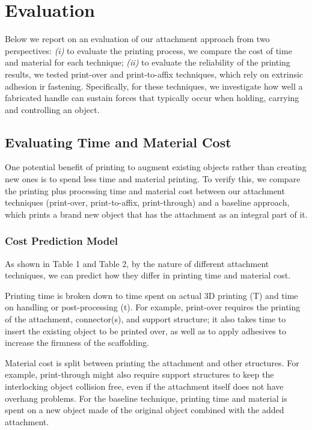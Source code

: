 \section{Evaluation}
Below we report on an evaluation of our attachment approach from two perspectives: {\em (i)} to evaluate the printing process, we compare the cost of time and material for each technique; {\em (ii)} to evaluate the reliability of the printing results, we tested print-over and print-to-affix techniques, which rely on extrinsic adhesion ir fastening. Specifically, for these techniques, we investigate how well a fabricated handle can sustain forces that typically occur when holding, carrying and controlling an object.

\subsection{Evaluating Time and Material Cost}
One potential benefit of printing to augment existing objects rather than creating new ones is to spend less time and material printing. To verify this, we compare the printing plus processing time and material cost between our attachment techniques (print-over, print-to-affix, print-through) and a baseline approach, which prints a brand new object that has the attachment as an integral part of it.

\subsubsection{Cost Prediction Model}
As shown in Table 1 and Table 2, by the nature of different attachment techniques, we can predict how they differ in printing time and material cost.

Printing time is broken down to time spent on actual 3D printing (T) and time on handling or post-processing (t). For example, print-over requires the printing of the attachment, connector(s), and support structure; it also takes time to insert the existing object to be printed over, as well as to apply adhesives to increase the firmness of the scaffolding.

Material cost is split between printing the attachment and other structures. For example, print-through might also require support structures to keep the interlocking object collision free, even if the attachment itself does not have overhang problems.
For the baseline technique, printing time and material is spent on a new object made of the original object combined with the added attachment.

